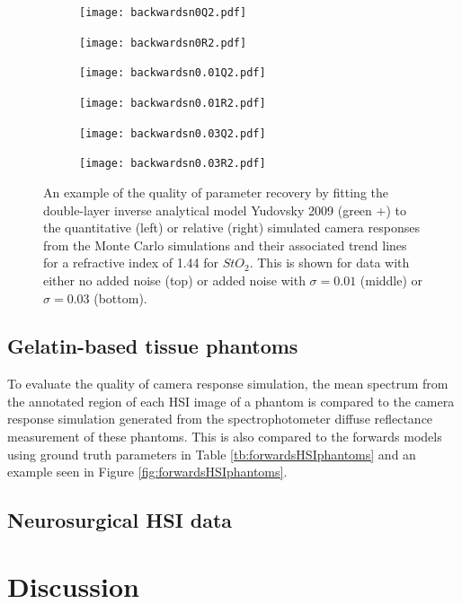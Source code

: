 \begin{figure}[htbp]
    \centering
    \begin{subfigure}{0.49\textwidth}
        \texttt{[image: backwardsn0Q2.pdf]}
        \caption{}
        \label{fig:backwardsn0Q2}
    \end{subfigure}
    \begin{subfigure}{0.49\textwidth}
        \texttt{[image: backwardsn0R2.pdf]}
        \caption{}
        \label{fig:backwardsn0R2}
    \end{subfigure}
    \begin{subfigure}{0.49\textwidth}
        \texttt{[image: backwardsn0.01Q2.pdf]}
        \caption{}
        \label{fig:backwardsn0.01Q2}
    \end{subfigure}
    \begin{subfigure}{0.49\textwidth}
        \texttt{[image: backwardsn0.01R2.pdf]}
        \caption{}
        \label{fig:backwardsm0.01R2}
    \end{subfigure}
    \begin{subfigure}{0.49\textwidth}
        \texttt{[image: backwardsn0.03Q2.pdf]}
        \caption{}
        \label{fig:backwardsn0.03Q2}
    \end{subfigure}
    \begin{subfigure}{0.49\textwidth}
        \texttt{[image: backwardsn0.03R2.pdf]}
        \caption{}
        \label{fig:backwardsm0.03R2}
    \end{subfigure}
    \caption{An example of the quality of parameter recovery by fitting the double-layer inverse analytical model Yudovsky 2009 (\textcolor{MyGreen}{green $+$}) to the quantitative (left) or relative (right) simulated camera responses from the Monte Carlo simulations and their associated trend lines for a refractive index of 1.44 for $StO_2$. This is shown for data with either no added noise (top) or added noise with $\sigma = 0.01$ (middle) or $\sigma = 0.03$ (bottom).}
    \label{fig:backwardsHSIMC2}
\end{figure}

\subsection{Gelatin-based tissue phantoms}
To evaluate the quality of camera response simulation, the mean spectrum from the annotated region of each HSI image of a phantom is compared to the camera response simulation generated from the spectrophotometer diffuse reflectance measurement of these phantoms. This is also compared to the forwards models using ground truth parameters in Table \ref{tb:forwardsHSIphantoms} and an example seen in Figure \ref{fig:forwardsHSIphantoms}. 


\subsection{Neurosurgical HSI data}

\section{Discussion}